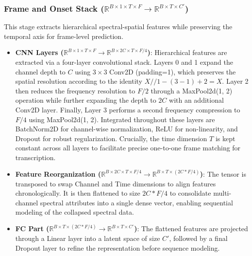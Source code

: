 \documentclass{article}
\begin{document}
\subsubsection[Frame and Onset Stack]{Frame and Onset Stack ($\mathbb{R}^{B \times 1 \times T \times F} \rightarrow \mathbb{R}^{B \times T \times C'}$)}
This stage extracts hierarchical spectral-spatial features while preserving the temporal axis for frame-level prediction.
\begin{itemize}
    \item \textbf{CNN Layers ($\mathbb{R}^{B \times 1 \times T \times F} \rightarrow \mathbb{R}^{B \times 2C \times T \times F/4}$)}: Hierarchical features are extracted via a four-layer convolutional stack. Layers 0 and 1 expand the channel depth to $C$ using $3 \times 3$ Conv2D (padding=1), which preserves the spatial resolution according to the identity $X // 1 - (3-1) + 2 = X$. Layer 2 then reduces the frequency resolution to $F/2$ through a MaxPool2d(1, 2) operation while further expanding the depth to $2C$ with an additional Conv2D layer. Finally, Layer 3 performs a second frequency compression to $F/4$ using MaxPool2d(1, 2). Integrated throughout these layers are BatchNorm2D for channel-wise normalization, ReLU for non-linearity, and Dropout for robust regularization. Crucially, the time dimension $T$ is kept constant across all layers to facilitate precise one-to-one frame matching for transcription.
    
    \item \textbf{Feature Reorganization ($\mathbb{R}^{B \times 2C \times T \times F/4} \rightarrow \mathbb{R}^{B \times T \times (2C * F/4)}$)}: The tensor is transposed to swap Channel and Time dimensions to align features chronologically. It is then flattened to size $ 2C * F/4$ to consolidate multi-channel spectral attributes into a single dense vector, enabling sequential modeling of the collapsed spectral data.
    
    \item \textbf{FC Part ($\mathbb{R}^{B \times T \times (2C * F/4)} \rightarrow \mathbb{R}^{B \times T \times C'}$)}: The flattened features are projected through a Linear layer into a latent space of size $C'$, followed by a final Dropout layer to refine the representation before sequence modeling.
\end{itemize}
\end{document}
